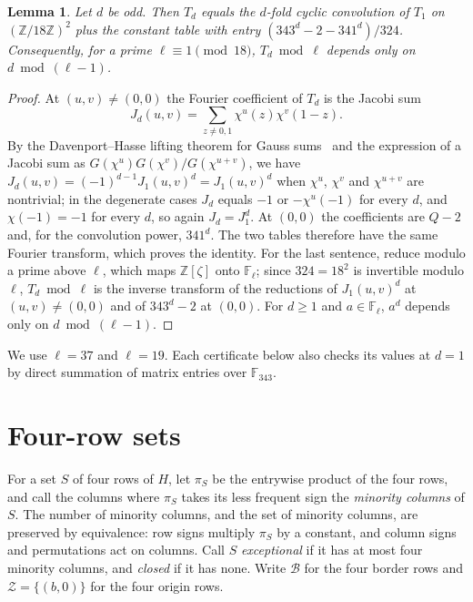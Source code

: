 \documentclass[11pt]{article}
\theoremstyle{plain}
\newtheorem{lemma}[theorem]{Lemma}
\theoremstyle{definition}
\theoremstyle{remark}
\newcommand{\F}{\mathbb F}
\newcommand{\Z}{\mathbb Z}
\begin{document}
\begin{lemma}\label{lem:lift}
Let $d$ be odd. Then $T_d$ equals the $d$-fold cyclic convolution of $T_1$
on $(\Z/18\Z)^2$ plus the constant table with entry $(343^d-2-341^d)/324$.
Consequently, for a prime $\ell\equiv1\pmod{18}$, $T_d\bmod\ell$ depends only
on $d\bmod(\ell-1)$.
\end{lemma}

\begin{proof}
At $(u,v)\ne(0,0)$ the Fourier coefficient of $T_d$ is the Jacobi sum
\[
 J_d(u,v)=\sum_{z\ne0,1}\chi^u(z)\chi^v(1-z).
\] By the Davenport--Hasse
lifting theorem for Gauss sums~\cite[Theorem 5.14]{LidlNiederreiter}
and the expression of a Jacobi sum as $G(\chi^u)G(\chi^v)/G(\chi^{u+v})$,
we have $J_d(u,v)=(-1)^{d-1}J_1(u,v)^d=J_1(u,v)^d$ when $\chi^u$, $\chi^v$
and $\chi^{u+v}$ are nontrivial; in the degenerate cases $J_d$ equals $-1$ or
$-\chi^u(-1)$ for every $d$, and $\chi(-1)=-1$ for every $d$, so again
$J_d=J_1^d$. At $(0,0)$ the coefficients are $Q-2$ and, for the convolution
power, $341^d$. The two tables therefore have the same Fourier transform,
which proves the identity. For the last sentence, reduce modulo a prime
above $\ell$, which maps $\Z[\zeta]$ onto $\F_\ell$; since $324=18^2$ is
invertible modulo $\ell$, $T_d\bmod\ell$ is the inverse transform of the
reductions of $J_1(u,v)^d$ at $(u,v)\ne(0,0)$ and of $343^d-2$ at
$(0,0)$. For $d\ge1$ and
$a\in\F_\ell$, $a^d$ depends only on $d\bmod(\ell-1)$.
\end{proof}

We use $\ell=37$ and $\ell=19$. Each certificate below also checks its values
at $d=1$ by direct summation of matrix entries over $\F_{343}$.

\section{Four-row sets}\label{sec:quartets}

For a set $S$ of four rows of $H$, let $\pi_S$ be the entrywise product of
the four rows, and call the columns where $\pi_S$ takes its less frequent
sign the \emph{minority columns} of $S$. The number of minority columns, and
the set of minority columns, are preserved by equivalence: row signs
multiply $\pi_S$ by a constant, and column signs and permutations act on
columns. Call $S$ \emph{exceptional} if it has at most four minority
columns, and \emph{closed} if it has none. Write $\mathcal B$ for the four
border rows and $\mathcal Z=\{(b,0)\}$ for the four origin rows.
\end{document}
